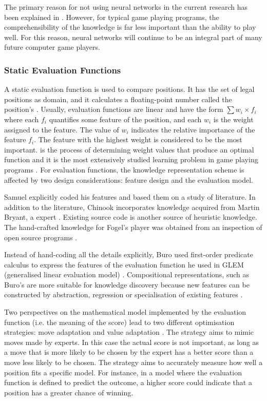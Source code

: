 The primary reason for not using neural networks in the current research has been explained in .  However, for typical game playing programs, the comprehensibility of the knowledge is far less important than the ability to play well.  For this reason, neural networks will continue to be an integral part of many future computer game players.

\subsubsection{Static Evaluation Functions}
\label{sec:functions}
A static evaluation function is used to compare positions.  It has the set of legal positions as domain, and it calculates a floating-point number called the position's .  Usually, evaluation functions are linear and have the form $\sum w_i \times f_i$ where each $f_i$ quantifies some feature of the position, and each $w_i$ is the weight assigned to the feature.  The value of $w_i$ indicates the relative importance of the feature $f_i$.  The feature with the highest weight is considered to be the most important.   is the process of determining weight values that produce an optimal function and it is the most extensively studied learning problem in game playing programs \cite{furnkranz:survey}.   For evaluation functions, the knowledge representation scheme is affected by two design considerations: feature design and the evaluation model.

Samuel \cite{samuel:checkers} explicitly coded his features and based them on a study of  literature.   In addition to the literature, Chinook incorporates knowledge acquired from Martin Bryant, a  expert \cite{schaeffer:reexamination}. Existing source code is another source of heuristic knowledge. The hand-crafted knowledge for Fogel's  player was obtained from an inspection of open source  programs \cite{fogel:chess}. 

Instead of hand-coding all the details explicitly, Buro used first-order predicate calculus to express the features of the evaluation function he used in GLEM (generalised linear evaluation model) \cite{buro:feature}. Compositional representations, such as Buro's are more suitable for knowledge discovery because new features can be constructed by abstraction, regression or specialisation of existing features \cite{furnkranz:survey}.

Two perspectives on the mathematical model implemented by the evaluation  function (i.e. the meaning of the score) lead to two different optimisation strategies: move adaptation and value adaptation \cite{buro:statistical}.  The  strategy aims to mimic moves made by experts.  In this case the actual score is not important, as long as a move that is more likely to be chosen by the expert has a better score than a move less likely to be chosen. The   strategy aims to accurately measure how well a position fits a specific model.  For instance, in a model where the evaluation function is defined to predict the outcome, a higher score could indicate that a position has a greater chance of winning.  

